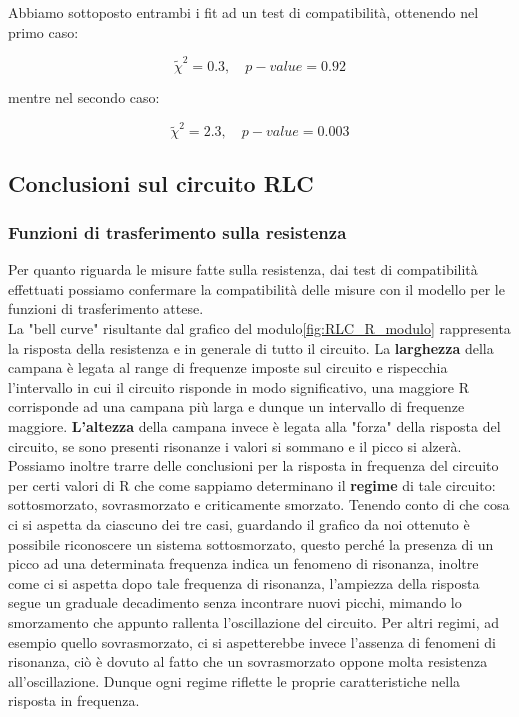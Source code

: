 \documentclass[letterpaper,12pt]{article}
\begin{document}
Abbiamo sottoposto entrambi i fit ad un test di compatibilità, ottenendo nel primo caso:

$$ \widetilde{\chi}^2 = 0.3, \quad p-value = 0.92 $$

mentre nel secondo caso:

$$ \widetilde{\chi}^2 = 2.3, \quad p-value = 0.003 $$


\subsection{Conclusioni sul circuito RLC}

\subsubsection{Funzioni di trasferimento sulla resistenza}
Per quanto riguarda le misure fatte sulla resistenza, dai test di compatibilità effettuati possiamo confermare la compatibilità delle misure con il modello per le funzioni di trasferimento attese. \\ 
La "bell curve" risultante dal grafico del modulo\ref{fig:RLC_R_modulo} rappresenta la risposta della resistenza e in generale di tutto il circuito. La \textbf{larghezza} della campana è legata al range di frequenze imposte sul circuito e rispecchia l'intervallo in cui il circuito risponde in modo significativo, una maggiore R corrisponde ad una campana più larga e dunque un intervallo di frequenze maggiore.
\textbf{L'altezza} della campana invece è legata alla "forza" della risposta del circuito, se sono presenti risonanze i valori si sommano e il picco si alzerà.
Possiamo inoltre trarre delle conclusioni per la risposta in frequenza del circuito per certi valori di R che come sappiamo determinano il \textbf{regime} di tale circuito: sottosmorzato, sovrasmorzato e criticamente smorzato.
Tenendo conto di che cosa ci si aspetta da ciascuno dei tre casi, guardando il grafico da noi ottenuto è possibile riconoscere un sistema sottosmorzato, questo perché la presenza di un picco ad una determinata frequenza indica un fenomeno di risonanza, inoltre come ci si aspetta dopo tale frequenza di risonanza, l'ampiezza della risposta segue un graduale decadimento senza incontrare nuovi picchi, mimando lo smorzamento che appunto rallenta l'oscillazione del circuito. Per altri regimi, ad esempio quello sovrasmorzato, ci si aspetterebbe invece l'assenza di fenomeni di risonanza, ciò è dovuto al fatto che un sovrasmorzato oppone molta resistenza all'oscillazione. Dunque ogni regime riflette le proprie caratteristiche nella risposta in frequenza.\\
\end{document}

